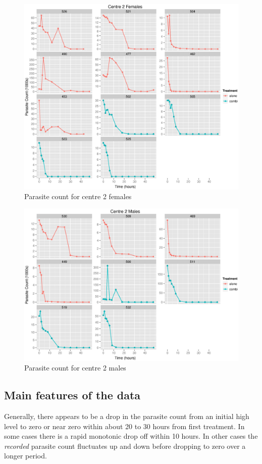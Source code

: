 \begin{figure}[h]
\centering
\includegraphics[width=6.1in]{raw2f.eps}
\caption{Parasite count for centre 2 females}\label{raw2F}
\end{figure} 
\begin{figure}[h]
\centering
\includegraphics[width=6.1in]{raw2m.eps}
\caption{Parasite count for centre 2 males}\label{raw2M}
\end{figure} 
\subsection{Main features of the data}
Generally, there appears to be a drop in the parasite count from an initial high level to zero or near zero within about 20 to 30 hours from first treatment. In some cases there is a rapid monotonic drop off within 10 hours. In other cases the \textit{recorded} parasite count fluctuates up and down before dropping to zero over a longer period.

